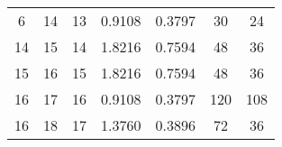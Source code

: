 \begin{table}[]
\begin{tabular}{@{}ccccccc@{}}
6                                                            & 14                                                              & 13                                                   & 0.9108                                                                          & 0.3797                                                                        & 30                                                                              & 24                                                                                   \\
14                                                           & 15                                                              & 14                                                   & 1.8216                                                                          & 0.7594                                                                        & 48                                                                              & 36                                                                                   \\
15                                                           & 16                                                              & 15                                                   & 1.8216                                                                          & 0.7594                                                                        & 48                                                                              & 36                                                                                   \\
16                                                           & 17                                                              & 16                                                   & 0.9108                                                                          & 0.3797                                                                        & 120                                                                             & 108                                                                                  \\
16                                                           & 18                                                              & 17                                                   & 1.3760                                                                          & 0.3896                                                                        & 72                                                                              & 36                                                                                   \\

\end{tabular}
\end{table}
